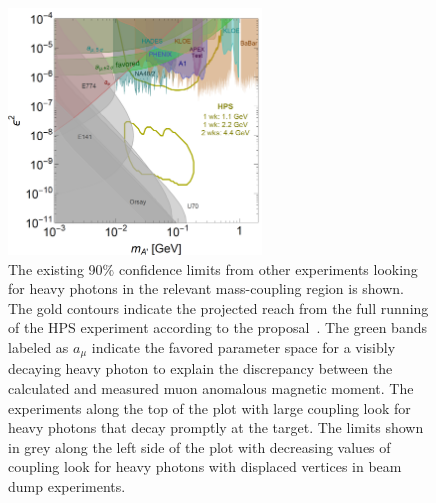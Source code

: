 \begin{figure}[htb]
  \centering
      \includegraphics[width=0.6\textwidth]{pics/intro/projectedReach.png}
  \caption[Projected reach for the HPS experiment]{The existing 90$\%$ confidence limits from other experiments looking for heavy photons in the relevant mass-coupling region is shown. The gold contours indicate the projected reach from the full running of the HPS experiment according to the proposal~\cite{collaboration_heavy_2013}. The green bands labeled as $a_\mu$ indicate the favored parameter space for a visibly decaying heavy photon to explain the discrepancy between the calculated and measured muon anomalous magnetic moment. The experiments along the top of the plot with large coupling look for heavy photons that decay promptly at the target. The limits shown in grey along the left side of the plot with decreasing values of coupling look for heavy photons with displaced vertices in beam dump experiments.}
  \label{Figure:projReach}
\end{figure}

